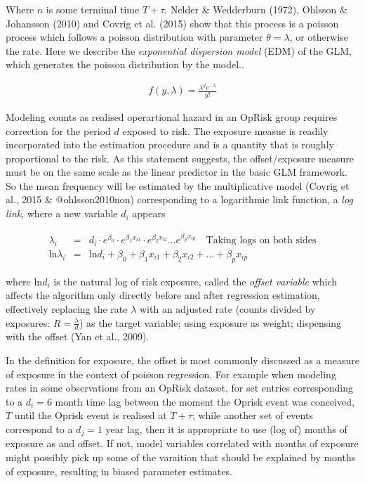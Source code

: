 \documentclass{DissertateUSU}
\begin{document}
Where \(n\) is some terminal time \(T+\tau\). Nelder \& Wedderburn
(1972), Ohlsson \& Johansson (2010) and Covrig et al. (2015) show that
this process is a poisson process which follows a poisson distribution
with parameter \(\theta = \lambda\), or otherwise the rate. Here we
describe the \emph{exponential dispersion model} (EDM) of the GLM, which
generates the poisson distribution by the model..

\singlespacing

\begin{eqnarray}\label{EDMpoisson}
f(y,\lambda) = \frac{\lambda^ye^{-\lambda}}{y!}
\end{eqnarray} \doublespacing

Modeling counts as realised operartional hazard in an OpRisk group
requires correction for the period \(d\) exposed to risk. The exposure
measue is readily incorporated into the estimation procedure and is a
quantity that is roughly proportional to the risk. As this statement
suggests, the offset/exposure measure must be on the same scale as the
linear predictor in the basic GLM framework. So the mean frequency will
be estimated by the multiplicative model (Covrig et al., 2015 \&
@ohlsson2010non) corresponding to a logarithmic link function, a
\emph{log link}, where a new variable \(d_i\) appears

\singlespacing

\begin{eqnarray}\label{EQlnOffset}
\lambda_i &=& d_i\cdot e^{\beta_0}\cdot e^{\beta_1x_{i1}}\cdot e^{\beta_2x_{i2}} \ldots e^{\beta_px_{ip}}\quad \mbox{Taking logs on both sides}\nonumber\\
\mbox{ln}\lambda_i &=&  \mbox{ln}d_i + \beta_0 + \beta_1x_{i1} + \beta_2x_{i2} + \ldots + \beta_px_{ip}
\end{eqnarray} \doublespacing

where ln\(d_i\) is the natural log of risk exposure, called the
\emph{offset variable} which affects the algorithm only directly before
and after regression estimation, effectively replacing the rate
\(\lambda\) with an adjusted rate (counts divided by exposures:
\(R=\frac{\lambda}{d}\)) as the target variable; using exposure as
weight; dispensing with the offset (Yan et al., 2009).\medskip  

In the definition for exposure, the offset is most commonly discussed as
a measure of exposure in the context of poisson regression. For example
when modeling rates in some observations from an OpRisk dataset, for set
entries corresponding to a \(d_i=6\) month time lag between the moment
the Oprisk event was conceived, \(T\) until the Oprisk event is realised
at \(T+\tau\); while another set of events correspond to a \(d_j=1\)
year lag, then it is appropriate to use (log of) months of exposure as
and offset. If not, model variables correlated with months of exposure
might possibly pick up some of the varaition that should be explained by
months of exposure, resulting in biased parameter estimates.
\end{document}
